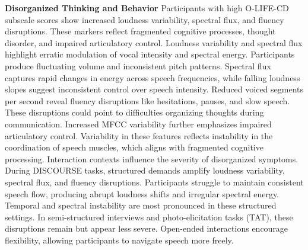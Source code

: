 \documentclass[9pt,a4paper]{rho-class/rho}
\begin{document}
\textbf{Disorganized Thinking and Behavior} Participants with high O-LIFE-CD subscale scores show increased loudness variability, spectral flux, and fluency disruptions. These markers reflect fragmented cognitive processes, thought disorder, and impaired articulatory control.
Loudness variability and spectral flux highlight erratic modulation of vocal intensity and spectral energy. Participants produce fluctuating volume and inconsistent pitch patterns. Spectral flux captures rapid changes in energy across speech frequencies, while falling loudness slopes suggest inconsistent control over speech intensity.
Reduced voiced segments per second reveal fluency disruptions like hesitations, pauses, and slow speech. These disruptions could point to difficulties organizing thoughts during communication. Increased MFCC variability further emphasizes impaired articulatory control. Variability in these features reflects instability in the coordination of speech muscles, which aligns with fragmented cognitive processing.
Interaction contexts influence the severity of disorganized symptoms. During DISCOURSE tasks, structured demands amplify loudness variability, spectral flux, and fluency disruptions. Participants struggle to maintain consistent speech flow, producing abrupt loudness shifts and irregular spectral energy. Temporal and spectral instability are most pronounced in these structured settings. In semi-structured interviews and photo-elicitation tasks (TAT), these disruptions remain but appear less severe. Open-ended interactions encourage flexibility, allowing participants to navigate speech more freely. 
\end{document}
